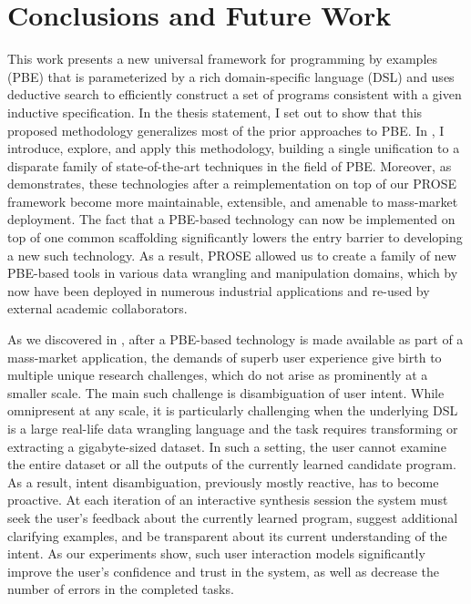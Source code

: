 \chapter{Conclusions and Future Work}
\label{ch:conclusion}

This work presents a new universal framework for programming by examples (PBE) that is parameterized by a
rich domain-specific language (DSL) and uses deductive search to efficiently construct a set of programs consistent with
a given inductive specification.
In the thesis statement, I set out to show that this proposed methodology generalizes most of the prior approaches to
PBE.
In , I introduce, explore, and apply this methodology, building a single
unification to a disparate family of state-of-the-art techniques in the field of PBE.
Moreover, as  demonstrates, these technologies after a reimplementation on top of our PROSE framework
become more maintainable, extensible, and amenable to mass-market deployment.
The fact that a PBE-based technology can now be implemented on top of one common scaffolding significantly lowers the
entry barrier to developing a new such technology.
As a result, PROSE allowed us to create a family of new PBE-based tools in various data wrangling and manipulation
domains, which by now have been deployed in numerous industrial applications and re-used by external academic
collaborators.

As we discovered in , after a PBE-based technology is made available as part of a mass-market
application, the demands of superb user experience give birth to multiple unique research challenges, which do not arise
as prominently at a smaller scale.
The main such challenge is disambiguation of user intent.
While omnipresent at any scale, it is particularly challenging when the underlying DSL is a large real-life data
wrangling language and the task requires transforming or extracting a gigabyte-sized dataset.
In such a setting, the user cannot examine the entire dataset or all the outputs of the currently learned candidate
program.
As a result, intent disambiguation, previously mostly reactive, has to become proactive.
At each iteration of an interactive synthesis session the system must seek the user's feedback about the currently
learned program, suggest additional clarifying examples, and be transparent about its current understanding of the
intent.
As our experiments show, such user interaction models significantly improve the user's confidence and trust in the
system, as well as decrease the number of errors in the completed tasks.

